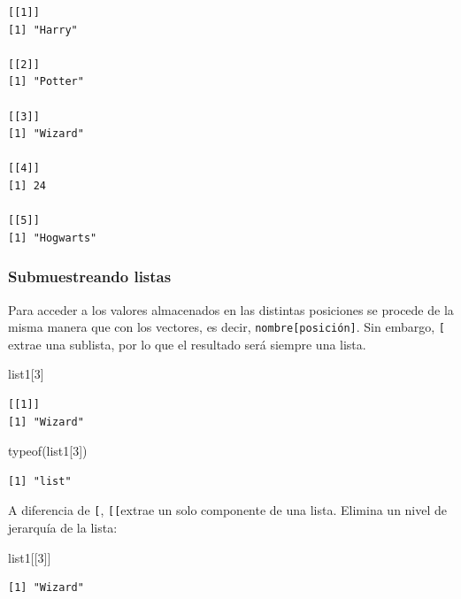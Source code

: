 \documentclass[
  letterpaper,
  DIV=11,
  numbers=noendperiod]{scrreprt}
\newenvironment{Shaded}{\begin{snugshade}}{\end{snugshade}}
\newcommand{\DecValTok}[1]{\textcolor[rgb]{0.68,0.00,0.00}{#1}}
\newcommand{\FunctionTok}[1]{\textcolor[rgb]{0.28,0.35,0.67}{#1}}
\newcommand{\NormalTok}[1]{\textcolor[rgb]{0.00,0.23,0.31}{#1}}
\begin{document}
\begin{verbatim}
[[1]]
[1] "Harry"

[[2]]
[1] "Potter"

[[3]]
[1] "Wizard"

[[4]]
[1] 24

[[5]]
[1] "Hogwarts"
\end{verbatim}

\hypertarget{submuestreando-listas}{%
\subsubsection{Submuestreando listas}\label{submuestreando-listas}}

Para acceder a los valores almacenados en las distintas posiciones se
procede de la misma manera que con los vectores, es decir,
\texttt{nombre{[}posición{]}}. Sin embargo, \texttt{{[}} extrae una
sublista, por lo que el resultado será siempre una lista.

\begin{Shaded}
\begin{Highlighting}[]
\NormalTok{list1[}\DecValTok{3}\NormalTok{]}
\end{Highlighting}
\end{Shaded}

\begin{verbatim}
[[1]]
[1] "Wizard"
\end{verbatim}

\begin{Shaded}
\begin{Highlighting}[]
\FunctionTok{typeof}\NormalTok{(list1[}\DecValTok{3}\NormalTok{])}
\end{Highlighting}
\end{Shaded}

\begin{verbatim}
[1] "list"
\end{verbatim}

A diferencia de \texttt{{[}}, \texttt{{[}{[}}extrae un solo componente
de una lista. Elimina un nivel de jerarquía de la lista:

\begin{Shaded}
\begin{Highlighting}[]
\NormalTok{list1[[}\DecValTok{3}\NormalTok{]]}
\end{Highlighting}
\end{Shaded}

\begin{verbatim}
[1] "Wizard"
\end{verbatim}
\end{document}
